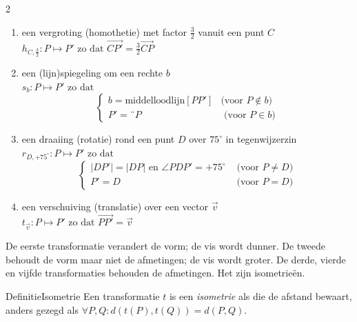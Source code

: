\begin{multicols}{2}
\begin{enumerate}
     
	    \item een vergroting (homothetie) met factor $\frac{3}{2}$ vanuit een punt $C$ \\
          $h_{C, \frac{3}{2}}: P\mapsto P' \text{ zo dat } \overrightarrow{CP'}=\frac{3}{2}\overrightarrow{CP}$
	    	
	 	    	
	    \item een (lijn)spiegeling om een rechte $b$\\
     $s_b: P\mapsto P' \text{ zo dat }$
    	    $$	    
    	    \left\{
       	    \begin{array}{ll}
    	         b= \text{middelloodlijn}[PP'] &\text{(voor } P\notin b)\\
    	         P'=¨P &\text{ (voor } P\in b)
            \end{array}   
    	    \right.
            $$ 	
	    	
	    		    	
	    \item een draaiing (rotatie) rond een punt $D$ over $75^\circ$ in tegenwijzerzin \\
      $r_{D,+75^\circ}: P\mapsto P' \text{ zo dat }$
            $$	    
    	    \left\{
       	    \begin{array}{ll}
    	         |DP'|=|DP| \text{ en } \angle PDP' = + 75^\circ &\text{ (voor } P\ne D)\\
     	         P'=D &\text{ (voor } P=D)
            \end{array}   
    	    \right.
            $$
           
            
	  	 
	  		
	  	\item een verschuiving (translatie) over een vector $\overrightarrow{v}$\\
    $t_{\overrightarrow{v}}: P\mapsto P' \text{ zo dat } \overrightarrow{PP'}=\overrightarrow{v}$
    		
    	
    \end{enumerate}

    De eerste transformatie verandert de vorm; de vis wordt dunner. De tweede behoudt de vorm maar niet de afmetingen; de vis wordt groter. De derde, vierde en vijfde transformaties behouden de afmetingen. Het zijn isometrieën. 
    
    \begin{kader}{Definitie}{Isometrie}
        Een transformatie $t$ is een \emph{isometrie} als die de afstand bewaart, anders gezegd als $\forall P, Q: d(t(P), t(Q))=d(P, Q).$
    \end{kader}
    

\end{multicols}

